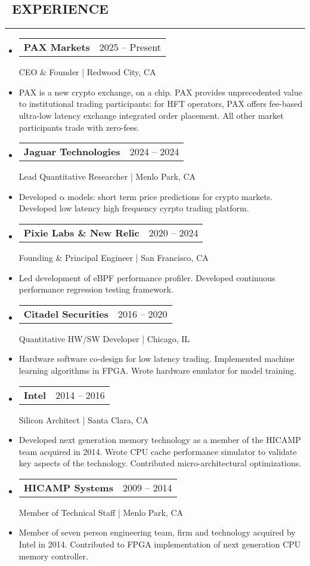 \documentclass[10pt,letterpaper]{article}
\makeatletter
\newenvironment{resumesection}[1]
{%
    \subsection*{\ \textcolor{light-gray}{#1} }
    \vspace{-0.4em}
    \begin{samepage}
    \hrule
    \end{samepage}
    \vspace{+0.4em}
    \begin{itemize}[leftmargin=0.15cm]
        \parskip=0.1em
}%
{%
    \end{itemize}
}%
\newcommand{\myitem}[1] {
    \item[] \textcolor{dark-gray}{#1}
}
\newcommand{\headertri}[3] {
    \item[] \begin{tabular*}{\linewidth}{l@{\extracolsep{\fill}}r}
    \textbf{#1} & #2 \\
    \end{tabular*}
    #3
}
\newcommand{\cminiw}{0.075}
\newcommand{\rminiw}{0.550}
\makeatother
\begin{document}
\begin{minipage}[t]{\cminiw\textwidth}
\end{minipage}\hfill
\begin{minipage}[t]{\rminiw\textwidth}
\begin{resumesection}{EXPERIENCE}
    \headertri
    {PAX Markets}
    {2025 -- Present}
    {CEO \& Founder | Redwood City, CA}
    \myitem{
        PAX is a new crypto exchange, on a chip. %
        PAX provides unprecedented value to institutional trading participants:
        for HFT operators, PAX offers fee-based ultra-low latency exchange integrated order placement.
        All other market participants trade with zero-fees.
    }
    
    \headertri
    {Jaguar Technologies}
    {2024 -- 2024}
    {Lead Quantitative Researcher | Menlo Park, CA}
    \myitem{
        Developed $\mathrm{ \alpha }$ models: short term price predictions for crypto markets.
        Developed low latency high frequency cyrpto trading platform.
    }
    
    \headertri
    {Pixie Labs \& New Relic}
    {2020 -- 2024}
    {Founding \& Principal Engineer | San Francisco, CA}
    \myitem{
        Led development of eBPF performance profiler.
        Developed continuous performance regression testing framework.
    }
    
    \headertri
    {Citadel Securities}
    {2016 -- 2020}
    {Quantitative HW/SW Developer | Chicago, IL}
    \myitem{
        Hardware software co-design for low latency trading.
        Implemented machine learning algorithms in FPGA.
        Wrote hardware emulator for model training.
    }
    
    \headertri
    {Intel}
    {2014 -- 2016}
    {Silicon Architect | Santa Clara, CA}
    \myitem{
        Developed next generation memory technology as a member of the HICAMP team acquired in 2014.
        Wrote CPU cache performance simulator to validate key aspects of the technology.
        Contributed micro-architectural optimizations.
    }
    
    
    \headertri
    {HICAMP Systems}
    {2009 -- 2014}
    {Member of Technical Staff | Menlo Park, CA}
    \myitem{
        Member of seven person engineering team, firm and technology acquired by Intel in 2014.
        Contributed to FPGA implementation of next generation CPU memory controller.
    }
    

\end{resumesection}
\end{minipage}
\end{document}
